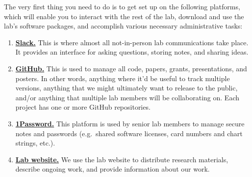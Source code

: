 \documentclass{tufte-book} %
\begin{document}
\noindent
{}The very first thing you need to do is to get set
up on the following platforms, which will enable you to interact with the
rest of the lab, download and use the lab's software packages, and
accomplish various necessary administrative tasks:
\begin{enumerate}
\item \href{https://context-lab.slack.com}{\textbf{Slack.}}  This is where
  almost all not-in-person lab communications take place.  It provides
  an interface for asking questions, storing notes, and sharing
  ideas.
\item \href{https://www.github.com}{\textbf{GitHub.}}
    This is used to manage all code, papers, grants,
  presentations, and posters.  In other words, anything where it'd be
  useful to track multiple versions, anything that we might ultimately
  want to release to the public, and/or anything that multiple lab
  members will be collaborating on.  Each project has one or more
  GitHub repositories.
\item \href{https://1password.com/}{\textbf{1Password.}}
   This platform is used by senior
  lab members to manage secure notes and passwords (e.g.\ shared
  software licenses, card numbers and chart strings, etc.).
\item \href{http://www.context-lab.com/}{\textbf{Lab website.}}
   We use the lab website to
  distribute research materials, describe ongoing work, and provide
  information about our work.
\end{enumerate}
\end{document}
